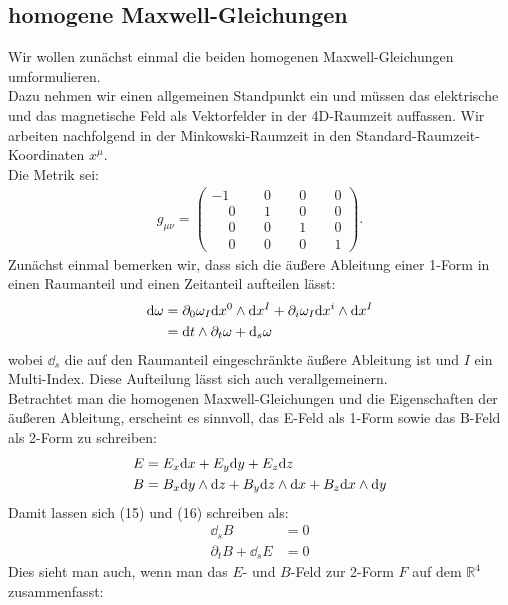 \subsection{homogene Maxwell-Gleichungen}
Wir wollen zunächst einmal die beiden homogenen Maxwell-Gleichungen umformulieren. \\
Dazu nehmen wir einen allgemeinen Standpunkt ein und müssen das elektrische und das magnetische Feld als Vektorfelder in der 4D-Raumzeit auffassen. Wir arbeiten nachfolgend in der Minkowski-Raumzeit in den Standard-Raumzeit-Koordinaten $x^{\mu}$. \\
Die Metrik sei:
\begin{align}
g_{\mu \nu} =
\begin{pmatrix}
-1 & \phantom{-}0 & \phantom{-}0 & \phantom{-}0 \\
\phantom{-}0 & \phantom{-}1 & \phantom{-}0 & \phantom{-}0 \\
\phantom{-}0 & \phantom{-}0 & \phantom{-}1 & \phantom{-}0 \\
\phantom{-}0 & \phantom{-}0 & \phantom{-}0 & \phantom{-}1
\end{pmatrix}.
\end{align}
Zunächst einmal bemerken wir, dass sich die äußere Ableitung einer 1-Form in einen Raumanteil und einen Zeitanteil aufteilen lässt:
\begin{align}
\dd \omega &= \partial_0 \omega_I \dd x^0 \wedge \dd x^{I} + \partial_i \omega_I \dd x^i \wedge \dd x^{I} \notag\\
&= \dd t \wedge \partial_t \omega + \dd_s \omega 
\end{align}
wobei $\dd_s$ die auf den Raumanteil eingeschränkte äußere Ableitung ist und $I$ ein Multi-Index. Diese Aufteilung lässt sich auch verallgemeinern.\\
Betrachtet man die homogenen Maxwell-Gleichungen und die Eigenschaften der äußeren Ableitung, erscheint es sinnvoll, das E-Feld als 1-Form sowie das B-Feld als 2-Form zu schreiben:
\begin{align}
E &= E_x \dd x +E_y \dd y + E_z \dd z   \\
B &= B_x \dd y \wedge \dd z + B_y \dd z \wedge \dd x + B_z \dd x \wedge \dd y 
\end{align}
Damit lassen sich (15) und (16) schreiben als:
\begin{align}
\dd_s B &= 0 \\
\partial_t B + \dd_s E &=0
\end{align}
Dies sieht man auch, wenn man das $E$- und $B$-Feld zur 2-Form $F$ auf dem $\mathbb{R}^4$ zusammenfasst:
